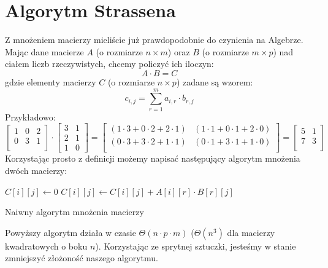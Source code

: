 \section{Algorytm Strassena}

\label{sec:strassen}

Z mnożeniem macierzy mieliście już prawdopodobnie do czynienia na Algebrze.
Mając dane macierze $A$ (o rozmiarze $n \times m$) oraz $B$ (o rozmiarze $m \times p$) nad ciałem liczb rzeczywistych, chcemy policzyć ich iloczyn:
\[
 A \cdot B = C
\]
gdzie elementy macierzy $C$ (o rozmiarze $n \times p$) zadane są wzorem:
\[
 c_{i,j} = \sum_{r=1}^{m} a_{i,r} \cdot b_{r,j}
\]
Przykładowo:
\[
  \begin{bmatrix}
    1 & 0 & 2 \\
    0 & 3 & 1 \\
  \end{bmatrix}
\cdot
  \begin{bmatrix}
    3 & 1 \\
    2 & 1 \\
    1 & 0
  \end{bmatrix}
=
  \begin{bmatrix}
     (1 \cdot 3  +  0 \cdot 2  +  2 \cdot 1) & (1 \cdot 1   +   0 \cdot 1   +   2 \cdot 0) \\
     (0 \cdot 3  +  3 \cdot 2  +  1 \cdot 1) & (0 \cdot 1   +   3 \cdot 1   +   1 \cdot 0) \\
  \end{bmatrix}
=
  \begin{bmatrix}
    5 & 1 \\
    7 & 3 \\
  \end{bmatrix}
\]
Korzystając prosto z definicji możemy napisać następujący algorytm mnożenia dwóch macierzy:

\begin{algorithm}[H]
  \DontPrintSemicolon
  
  
  
  {
     {
	$C[i][j] \leftarrow 0$\;
	{
	  $C[i][j] \leftarrow C[i][j] + A[i][r] \cdot B[r][j]$\;
	}
     }
  }
  
  \caption{Naiwny algorytm mnożenia macierzy}
  \label{alg-mnozenie-macierzy}
\end{algorithm}
Powyższy algorytm działa w czasie $\Theta(n \cdot p \cdot m)$ ($\Theta(n^3)$ dla macierzy kwadratowych o boku $n$).
Korzystając ze sprytnej sztuczki, jesteśmy w stanie zmniejszyć złożoność naszego algorytmu.

